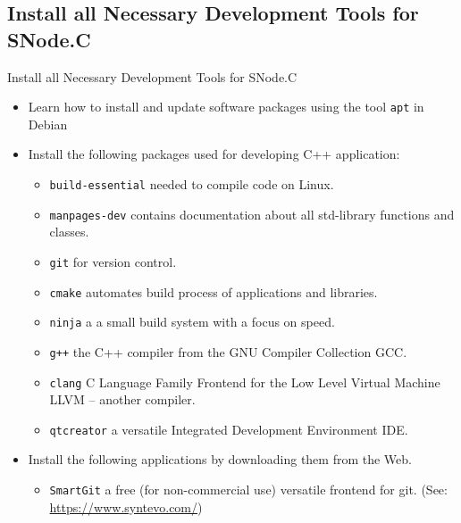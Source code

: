 \subsection{Install all Necessary Development Tools for SNode.C}

\begin{frame}{Install all Necessary Development Tools for SNode.C}
  \begin{itemize}
    \item Learn how to install and update software packages using the tool \alert{\texttt{apt}} in Debian
    \item Install the following packages used for developing C++ application:
    \begin{itemize}
      \item \textcolor{fh-ooe-red}{\texttt{build-essential}} needed to compile code on Linux.
      \item \textcolor{fh-ooe-red}{\texttt{manpages-dev}} contains documentation about all std-library functions and classes.
      \item \textcolor{fh-ooe-red}{\texttt{git}} for version control.
      \item \textcolor{fh-ooe-red}{\texttt{cmake}} automates build process of applications and libraries.
      \item \textcolor{fh-ooe-red}{\texttt{ninja}} a a small build system with a focus on speed.
      \item \textcolor{fh-ooe-red}{\texttt{g++}} the C++ compiler from the \textcolor{fh-ooe-red}{G}NU \textcolor{fh-ooe-red}{C}ompiler \textcolor{fh-ooe-red}{C}ollection \textcolor{fh-ooe-red}{GCC}.
      \item \textcolor{fh-ooe-red}{\texttt{clang}} \textcolor{fh-ooe-red}{C} \textcolor{fh-ooe-red}{L}anguage \textcolor{fh-ooe-red}{F}amily \textcolor{fh-ooe-red}{F}rontend for the \textcolor{fh-ooe-red}{L}ow \textcolor{fh-ooe-red}{L}evel \textcolor{fh-ooe-red}{V}irtual \textcolor{fh-ooe-red}{M}achine \textcolor{fh-ooe-red}{LLVM} -- another compiler.
      \item \textcolor{fh-ooe-red}{\texttt{qtcreator}} a versatile \textcolor{fh-ooe-red}{I}ntegrated \textcolor{fh-ooe-red}{D}evelopment \textcolor{fh-ooe-red}{E}nvironment \textcolor{fh-ooe-red}{IDE}.
    \end{itemize}
    \item Install the following applications by downloading them from the Web.
    \begin{itemize}
      \item \textcolor{fh-ooe-red}{\texttt{SmartGit}} a free (for non-commercial use) versatile frontend for git. (See: \textcolor{fh-ooe-red}{\href{https://www.syntevo.com/}{https://www.syntevo.com/}})
    \end{itemize}
  \end{itemize}
\end{frame}
